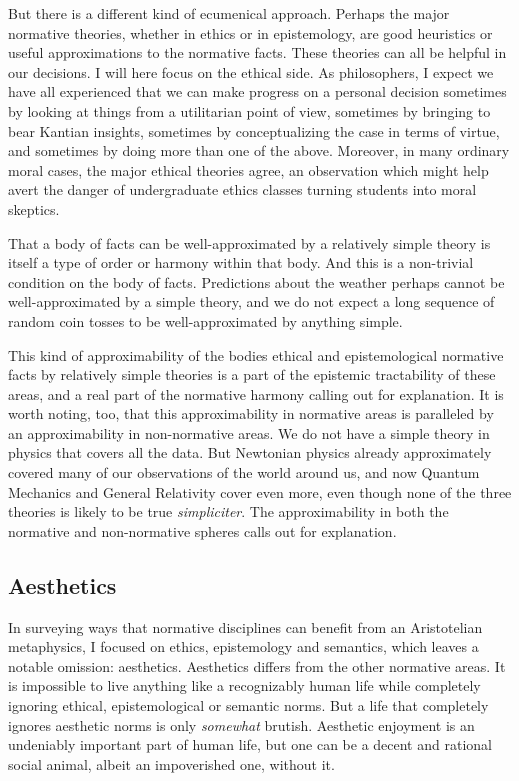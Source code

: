 But there is a different kind of ecumenical approach. Perhaps the major normative theories,
whether in ethics or in epistemology, are good heuristics or useful approximations to the 
normative facts. These theories can all be helpful in our decisions. I will here focus on the
ethical side. As philosophers, I expect we
have all experienced that we can make progress on a personal decision sometimes by looking at things
from a utilitarian point of view, sometimes by bringing to bear Kantian insights, sometimes
by conceptualizing the case in terms of virtue, and sometimes by doing more than one of the above. 
Moreover, in many ordinary moral cases, the major ethical theories agree, an observation 
which might help avert the danger of undergraduate ethics classes turning students into moral
skeptics. 

That a body of facts can be well-approximated by a relatively simple theory is itself a type
of order or harmony within that body. And this is a non-trivial condition on the body of facts.
Predictions about the weather perhaps cannot be well-approximated by a simple theory, and we
do not expect a long sequence of random coin tosses to be well-approximated by anything simple.

This kind of approximability of the bodies ethical and epistemological normative facts by relatively simple 
theories is a part of the epistemic tractability of these areas, and a real part of the normative
harmony calling out for explanation. It is worth noting, too, that this approximability in normative
areas is paralleled by an approximability in non-normative areas. We do not have a simple theory in
physics that covers all the data. But Newtonian physics already approximately covered many of our
observations of the world around us, and now Quantum Mechanics and General Relativity cover even more,
even though none of the three theories is likely to be true \textit{simpliciter}. The approximability
in both the normative and non-normative spheres calls out for explanation.

\subsection{Aesthetics}
In surveying ways that normative disciplines can benefit from an Aristotelian metaphysics, I focused on 
ethics, epistemology and semantics, which leaves a notable omission: aesthetics. Aesthetics differs from
the other normative areas. It is impossible to live anything like a recognizably human 
life while completely ignoring ethical, epistemological or semantic norms. But a life that completely ignores 
aesthetic norms is only \textit{somewhat} brutish. Aesthetic enjoyment is an undeniably important part of 
human life, but one can be a decent and rational social animal, albeit an impoverished one, without it. 

